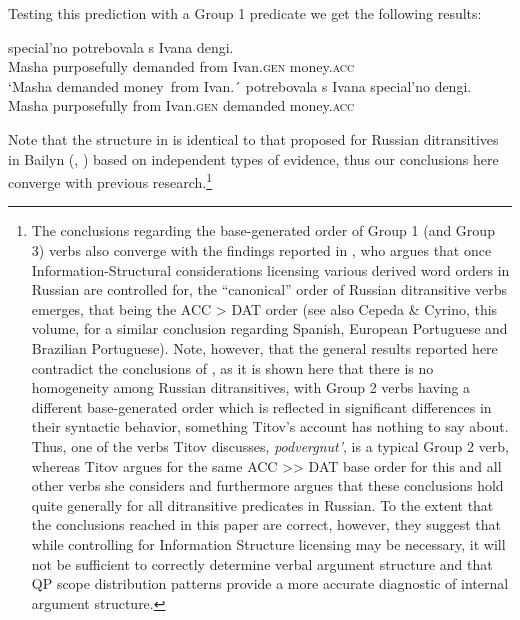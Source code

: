 \documentclass[output=paper,colorlinks,citecolor=brown,nonflat]{./langscibook}
\begin{document}
Testing this prediction with a Group 1 predicate we get the following results:

\ea%
    \label{ex:antonyuk:48}
    \ea \label{ex:antonyuk:48a}
       {special’no}    {potrebovala} {s}       {Ivana}      {dengi}.\\
    Masha purposefully demanded     from Ivan.\textsc{gen} money.\textsc{acc}\\
    \glt `Masha demanded money~from Ivan.´
    \ex \label{ex:antonyuk:48b}
       {potrebovala}  {s}       {Ivana}       {special’no} {dengi}.\\
    Masha purposefully from Ivan.\textsc{gen} demanded  money.\textsc{acc}\\
    \z
\z

Note that the structure in  is identical to that proposed for Russian ditransitives in Bailyn (\citeyear{Bailyn1995}, \citeyear{Bailyn2012}) based on independent types of evidence, thus our conclusions here converge with previous research.\footnote{The conclusions regarding the base-generated order of Group 1 (and Group 3) verbs also converge with the findings reported in \citet{Titov2017}, who argues that once Information-Structural considerations licensing various derived word orders in Russian are controlled for, the “canonical” order of Russian ditransitive verbs emerges, that being the ACC > DAT order (see also Cepeda \& Cyrino, this volume, for a similar conclusion regarding Spanish, European Portuguese and Brazilian Portuguese). Note, however, that the general results reported here contradict the conclusions of \citet{Titov2017}, as it is shown here that there is no homogeneity among Russian ditransitives, with Group 2 verbs having a different base-generated order which is reflected in significant differences in their syntactic behavior, something Titov’s account has nothing to say about. Thus, one of the verbs Titov discusses, \textit{podvergnut’}, is a typical Group 2 verb, whereas Titov argues for the same ACC >> DAT base order for this and all other verbs she considers and furthermore argues that these conclusions hold quite generally for all ditransitive predicates in Russian. To the extent that the conclusions reached in this paper are correct, however, they suggest that while controlling for Information Structure licensing may be necessary, it will not be sufficient to correctly determine verbal argument structure and that QP scope distribution patterns provide a more accurate diagnostic of internal argument structure.} 
\end{document}
